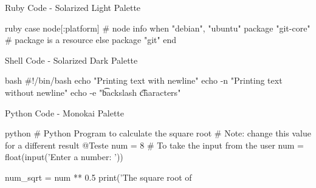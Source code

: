 \documentclass[aspectratio=169]{beamer} %
\begin{document}
\Black{

}%
\White{

}%


\begin{SliTC}{Ruby Code - Solarized Light Palette}
  \begin{CodeL}{ruby}
case node[:platform] # node info
when "debian", "ubuntu"
  package "git-core" # package is a resource
else 
  package "git"
end
  \end{CodeL}
\end{SliTC}

\begin{SliTC}{Shell Code - Solarized Dark Palette}
  \begin{CodeD}{bash}
#!/bin/bash
echo "Printing text with newline"
echo -n "Printing text without newline"
echo -e "\nRemoving \t backslash \t characters\n"
  \end{CodeD}
\end{SliTC}

\begin{SliTC}{Python Code - Monokai Palette}
  \begin{CodeM}{python}
# Python Program to calculate the square root
# Note: change this value for a different result
@Teste
num = 8 
# To take the input from the user
num = float(input('Enter a number: '))

num_sqrt = num ** 0.5
print('The square root of %
  \end{CodeM}
\end{SliTC}
\end{document}
